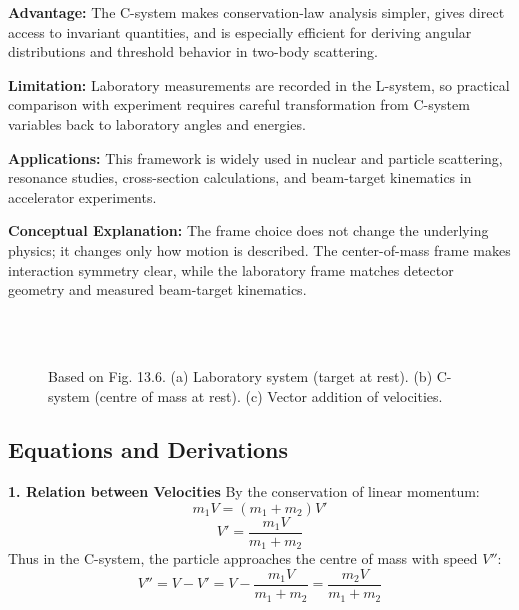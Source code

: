 \documentclass[12pt]{report}
\begin{document}
\textbf{Advantage:} The C-system makes conservation-law analysis simpler, gives direct access to invariant quantities, and is especially efficient for deriving angular distributions and threshold behavior in two-body scattering.

\textbf{Limitation:} Laboratory measurements are recorded in the L-system, so practical comparison with experiment requires careful transformation from C-system variables back to laboratory angles and energies.

\textbf{Applications:} This framework is widely used in nuclear and particle scattering, resonance studies, cross-section calculations, and beam-target kinematics in accelerator experiments.

\textbf{Conceptual Explanation:} The frame choice does not change the underlying physics; it changes only how motion is described. The center-of-mass frame makes interaction symmetry clear, while the laboratory frame matches detector geometry and measured beam-target kinematics.

\begin{figure}[H]
    \centering
     \\
    \vspace{0.5cm}
     \\
    \vspace{0.5cm}
    
    \caption{Based on Fig. 13.6. (a) Laboratory system (target at rest). (b) C-system (centre of mass at rest). (c) Vector addition of velocities.}
\end{figure}

\subsection*{Equations and Derivations}

\textbf{1. Relation between Velocities} By the conservation of linear momentum:
\begin{equation*}
m_1 V = (m_1 + m_2) V'
\end{equation*}
\begin{equation}
V' = \frac{m_1 V}{m_1 + m_2}
\end{equation}
Thus in the C-system, the particle approaches the centre of mass with speed $V''$:
\begin{equation}
V'' = V - V' = V - \frac{m_1 V}{m_1 + m_2} = \frac{m_2 V}{m_1 + m_2}
\end{equation}
\end{document}
